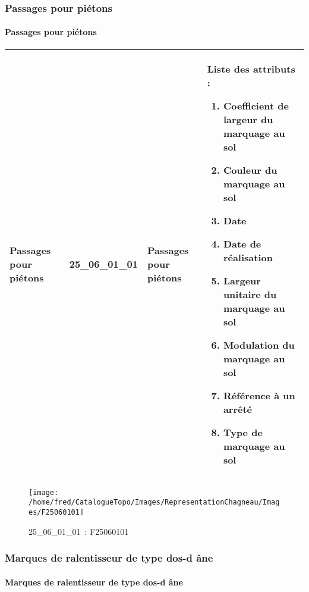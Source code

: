 \documentclass[12pt,titlepage,oneside]{book}
\begin{document}
\subsubsection{\large Passages pour piétons}
\paragraph{Passages pour piétons}
\noindent
\vspace{\baselineskip}

\renewcommand{\arraystretch}{1.2}
\begin{supertabular}{|p{10cm}|c|p{13cm}|p{12cm}|}
 Passages pour piétons & 25\_06\_01\_01 & Passages pour piétons & Liste des attributs :
\begin{enumerate}
  \item Coefficient de largeur du marquage au sol  \item Couleur du marquage au sol  \item Date  \item Date de réalisation  \item Largeur unitaire du marquage au sol  \item Modulation du marquage au sol  \item Référence à un arrêté  \item Type de marquage au sol\end{enumerate}
\\
\hline
\end{supertabular}
\begin{figure}[h!]
  \hfill         %
  \begin{minipage}[t]{3cm}
    \begin{center}
      \texttt{[image: /home/fred/CatalogueTopo/Images/RepresentationChagneau/Images/F25060101]}
      \caption[~25\_06\_01\_01]{\small{25\_06\_01\_01~:} \tiny{F25060101}}\label{F25060101}
    \end{center}
  \end{minipage}
\end{figure}

\subsubsection{\large Marques de ralentisseur de type dos-d âne}
\paragraph{Marques de ralentisseur de type dos-d âne}
\noindent
\vspace{\baselineskip}
\end{document}
